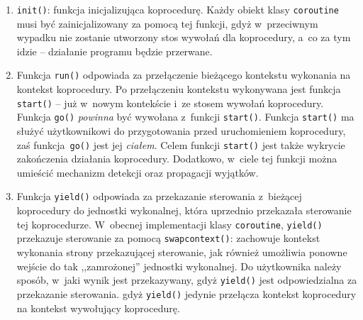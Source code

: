 \documentclass[12pt]{mwart}
\newcommand{\code}{\texttt}
\newcommand{\procbr}{()}
\newcommand{\function}[1]{\code{#1\procbr}}
\begin{document}
  \begin{enumerate}
    \item \function{init}: funkcja inicjalizująca koprocedurę. Każdy obiekt klasy \code{coroutine} musi być zainicjalizowany za pomocą tej funkcji,
      gdyż w~przeciwnym wypadku nie zostanie utworzony stos wywołań dla koprocedury, a~co za tym idzie -- działanie programu będzie przerwane.
    \item Funkcja \function{run} odpowiada za przełączenie bieżącego kontekstu wykonania na kontekst koprocedury. 
      Po przełączeniu kontekstu wykonywana jest funkcja \function{start} -- już w~nowym kontekście i~ze stosem wywołań koprocedury. Funkcja \function{go}
      \emph{powinna} być wywołana z~funkcji \function{start}. Funkcja \function{start} ma służyć użytkownikowi do przygotowania przed uruchomieniem koprocedury,
      zaś funkcja~\function{go} jest jej \emph{ciałem}. Celem funkcji \function{start} jest także wykrycie zakończenia działania koprocedury.
      Dodatkowo, w~ciele tej funkcji można umieścić mechanizm detekcji oraz propagacji wyjątków.
    \item Funkcja \function{yield} odpowiada za przekazanie sterowania z~bieżącej koprocedury do jednostki wykonalnej, która uprzednio przekazała sterowanie 
      tej koprocedurze. W~obecnej implementacji klasy \code{coroutine}, \function{yield} przekazuje sterowanie za pomocą \function{swapcontext}: zachowuje kontekst
      wykonania strony przekazującej sterowanie, jak również umożliwia ponowne wejście do tak ,,zamrożonej'' jednostki wykonalnej.
      Do użytkownika należy sposób, w~jaki wynik jest przekazywany, gdyż \function{yield} jest odpowiedzialna za przekazanie sterowania.
      gdyż \function{yield} jedynie przełącza kontekst koprocedury na kontekst wywołujący koprocedurę.
  \end{enumerate}
\par
%
\end{document}
